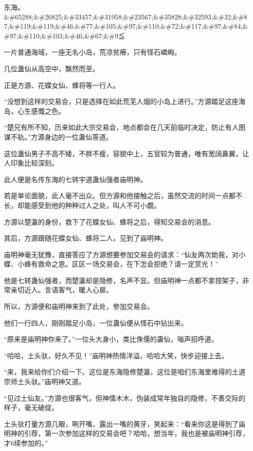 
\begin{this_body}

东海。\&\#65288;\&\#26825;\&\#33457;\&\#31958;\&\#23567;\&\#35828;\&\#32593;\&\#32;\&\#87;\&\#119;\&\#119;\&\#46;\&\#77;\&\#105;\&\#97;\&\#110;\&\#72;\&\#117;\&\#97;\&\#84;\&\#97;\&\#110;\&\#103;\&\#46;\&\#67;\&\#9≦

一片普通海域，一座无名小岛，荒凉贫瘠，只有怪石嶙峋。

几位蛊仙从高空中，飘然而至。

正是方源、花蝶女仙、蜂将等一行人。

“没想到这样的交易会，只是选择在如此荒芜人烟的小岛上进行。”方源踏足这座海岛，心生感慨之色。

“楚兄有所不知，历来如此大宗交易会，地点都会在几天前临时决定，防止有人图谋不轨。”方源身边的一位蛊仙答道。

这位蛊仙男子不高不矮，不胖不瘦，容貌中上，五官较为普通，唯有宽阔鼻翼，让人印象比较深刻。

此人便是名传东海的七转宇道蛊仙强者庙明神。

若是单论面貌，此人毫不出众。但方源和他接触之后，虽然交流的时间一点都不长，却能感受到他的种种过人之处，叫人不可小觑。

方源以楚瀛的身份，救下了花蝶女仙、蜂将之后，得知交易会的消息。

其后，方源跟随花蝶女仙、蜂将二人，见到了庙明神。

庙明神毫无犹豫，直接答应了方源想要参加交易会的请求：“仙友两次助我，对小蝶、小蜂有救命之恩。区区一场交易会，在下怎会拒绝？请一定赏光！”

他是七转蛊仙强者，而楚瀛却是隐修，名声不显。但庙明神一点都不拿捏架子，非常亲切近人。言语客气，暖人心扉。

所以，方源便和庙明神来到了此处，参加交易会。

他们一行四人，刚刚踏足小岛，一位蛊仙便从怪石中钻出来。

“原来是庙明神你来了。”一位头大身小，类比侏儒的蛊仙，嗡声招呼道。

“哈哈，土头驮，好久不见！”庙明神热情洋溢，哈哈大笑，快步迎接上去。

“来，我来给你们介绍一下。这位是东海隐修楚瀛，这位是咱们东海里难得的土道宗师土头驮。”庙明神又道。

“见过土仙友。”方源也很客气，但神情木木，伪装成常年独自的隐修，不善交际的样子，毫无破绽。

土头驮打量方源几眼，咧开嘴，露出一嘴的黄牙，笑起来：“看来你这是得到了庙明神的引荐，第一次参加这样的交易会吧？哈哈，想当年，我也是被庙明神引荐，才6续参加的。”


\end{this_body}
